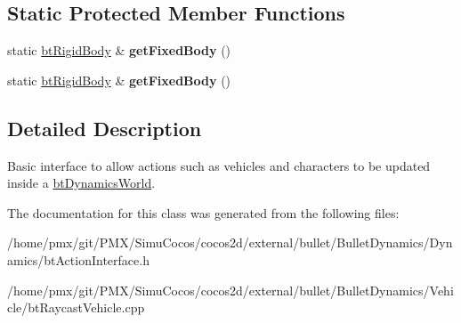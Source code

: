 \subsection*{Static Protected Member Functions}
\begin{DoxyCompactItemize}
\item 
\mbox{\label{classbtActionInterface_a4a1b027efbb978fa346eaa5bdc0877a7}} 
static \hyperlink{classbtRigidBody}{bt\+Rigid\+Body} \& {\bfseries get\+Fixed\+Body} ()
\item 
\mbox{\label{classbtActionInterface_a9ebf4f9748e902a0c5f0abf480d6a3a4}} 
static \hyperlink{classbtRigidBody}{bt\+Rigid\+Body} \& {\bfseries get\+Fixed\+Body} ()
\end{DoxyCompactItemize}


\subsection{Detailed Description}
Basic interface to allow actions such as vehicles and characters to be updated inside a \hyperlink{classbtDynamicsWorld}{bt\+Dynamics\+World}. 

The documentation for this class was generated from the following files\+:\begin{DoxyCompactItemize}
\item 
/home/pmx/git/\+P\+M\+X/\+Simu\+Cocos/cocos2d/external/bullet/\+Bullet\+Dynamics/\+Dynamics/bt\+Action\+Interface.\+h\item 
/home/pmx/git/\+P\+M\+X/\+Simu\+Cocos/cocos2d/external/bullet/\+Bullet\+Dynamics/\+Vehicle/bt\+Raycast\+Vehicle.\+cpp\end{DoxyCompactItemize}
